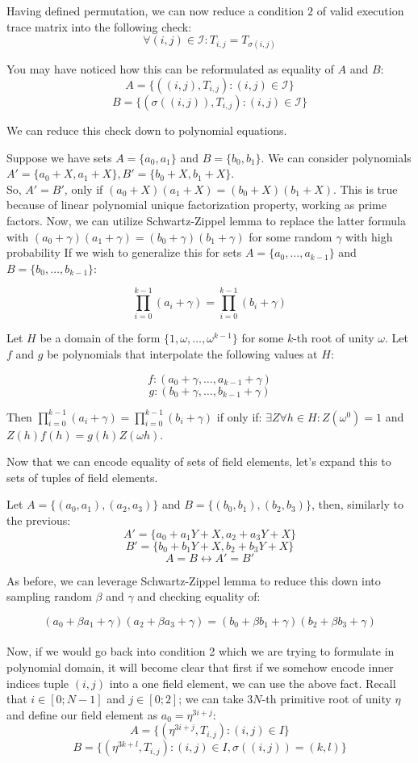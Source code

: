 \documentclass[../lecture-notes.tex]{subfiles}
\begin{document}
Having defined permutation, we can now reduce a condition $2$ of valid execution trace matrix into the following check:
\[\forall (i, j) \in \mathcal{I}: T_{i,j} = T_{\sigma(i,j)}\]

You may have noticed how this can be reformulated as equality of $A$ and $B$:
\[A = \{((i, j), T_{i,j}) : (i, j) \in \mathcal{I}\}\]
\[B = \{(\sigma((i, j)), T_{i,j}) : (i, j) \in \mathcal{I}\}\]

We can reduce this check down to polynomial equations.

Suppose we have sets \(A = \{a_0, a_1\}\) and \(B = \{b_0, b_1\}\). We can consider polynomials \(A' = \{a_0 + X, a_1 + X\}, B' = \{b_0 + X, b_1 + X\}\). 
\\
So, \(A' = B'\), only if \((a_0 + X)(a_1 + X) = (b_0 + X)(b_1 + X)\). This is true because of linear polynomial unique factorization property, working as prime factors. Now, we can utilize Schwartz-Zippel lemma to replace the latter formula with \((a_0 + \gamma)(a_1 + \gamma) = (b_0 + \gamma)(b_1 + \gamma)\) for some random $\gamma$ with high probability
If we wish to generalize this for sets \(A = \{a_0, \ldots, a_{k-1}\}\) and \(B = \{b_0, \ldots, b_{k-1}\}\):

\[\prod_{i=0}^{k-1} (a_i + \gamma) = \prod_{i=0}^{k-1} (b_i + \gamma)\]

Let $H$ be a domain of the form \(\{1, \omega, \dots, \omega^{k-1}\}\) for some $k$-th root of unity $\omega$. Let $f$ and $g$ be polynomials that interpolate the following values at $H$:

\[f: (a_0 + \gamma, \ldots, a_{k-1} + \gamma)\]
\[g: (b_0 + \gamma, \ldots, b_{k-1} + \gamma)\]

Then \(\prod_{i=0}^{k-1} (a_i + \gamma) = \prod_{i=0}^{k-1} (b_i + \gamma)\) if only if: \(\exists Z \forall h \in H: Z(\omega^{0}) = 1\) and  \(Z(h)f(h) = g(h)Z(\omega h)\).

Now that we can encode equality of sets of field elements, let's expand this to sets of tuples of field elements.

Let \(A = \{(a_0, a_1), (a_2, a_3)\}\) and \(B = \{(b_0, b_1), (b_2, b_3)\}\), then, similarly to the previous:
\[A' = \{a_0 + a_1Y + X, a_2 + a_3Y + X\}\]
\[B' = \{b_0 + b_1Y + X, b_2 + b_3Y + X\}\]
\[A = B \leftrightarrow A' = B'\]

As before, we can leverage Schwartz-Zippel lemma to reduce this down into sampling random $\beta$ and $\gamma$ and checking equality of:

\[(a_0 + \beta a_1 + \gamma)(a_2 + \beta a_3 + \gamma) = (b_0 + \beta b_1 + \gamma)(b_2 + \beta b_3 + \gamma)\]
\\
Now, if we would go back into condition 2 which we are trying to formulate in polynomial domain, it will become clear that first if we somehow encode inner indices tuple $(i, j)$ into a one field element, we can use the above fact.
Recall that $i \in [0; N-1]$ and $j \in [0; 2]$; we can take $3N$-th primitive root of unity $\eta$ and define our field element as \(a_0 = \eta^{3i + j}\):
\[A = \{(\eta^{3i+j}, T_{i,j}) : (i, j) \in I\}\]
\[B = \{(\eta^{3k+l}, T_{i,j}) : (i, j) \in I, \sigma((i, j)) = (k, l)\}\]
\end{document}
